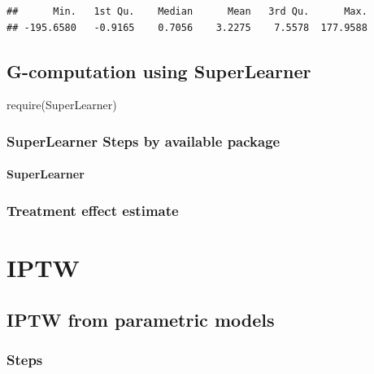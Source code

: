 \documentclass[
]{book}
\newenvironment{Shaded}{\begin{snugshade}}{\end{snugshade}}
\newcommand{\FunctionTok}[1]{\textcolor[rgb]{0.00,0.00,0.00}{#1}}
\newcommand{\NormalTok}[1]{#1}
\begin{document}
\begin{verbatim}
##      Min.   1st Qu.    Median      Mean   3rd Qu.      Max. 
## -195.6580   -0.9165    0.7056    3.2275    7.5578  177.9588
\end{verbatim}

\hypertarget{g-computation-using-superlearner}{%
\section{G-computation using SuperLearner}\label{g-computation-using-superlearner}}

\begin{Shaded}
\begin{Highlighting}[]
\FunctionTok{require}\NormalTok{(SuperLearner)}
\end{Highlighting}
\end{Shaded}

\hypertarget{superlearner-steps-by-available-package}{%
\subsection{SuperLearner Steps by available package}\label{superlearner-steps-by-available-package}}

\hypertarget{superlearner}{%
\subsubsection{SuperLearner}\label{superlearner}}

\hypertarget{treatment-effect-estimate-2}{%
\subsection{Treatment effect estimate}\label{treatment-effect-estimate-2}}

\hypertarget{iptw}{%
\chapter{IPTW}\label{iptw}}

\hypertarget{iptw-from-parametric-models}{%
\section{IPTW from parametric models}\label{iptw-from-parametric-models}}

\hypertarget{steps-1}{%
\subsection{Steps}\label{steps-1}}
\end{document}
